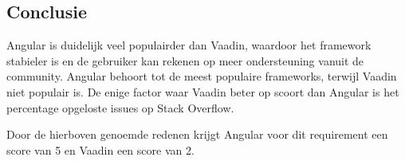 \subsection{Conclusie}
Angular is duidelijk veel populairder dan Vaadin, waardoor het framework stabieler is en de gebruiker kan rekenen op meer ondersteuning vanuit de community. Angular behoort tot de meest populaire frameworks, terwijl Vaadin niet populair is. De enige factor waar Vaadin beter op scoort dan Angular is het percentage opgeloste issues op Stack Overflow. 

Door de hierboven genoemde redenen krijgt Angular voor dit requirement een score van 5 en Vaadin een score van 2.



 